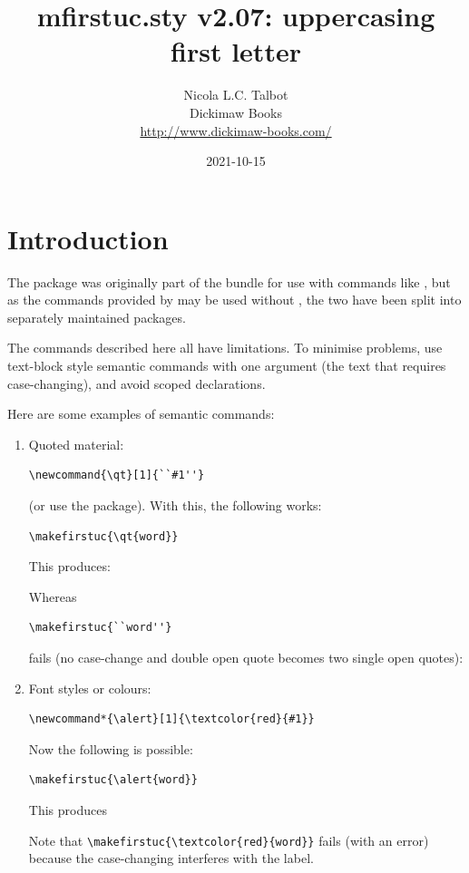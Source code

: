 \documentclass[report]{nlctdoc}
\begin{document}
\MakeShortVerb{|}
 \title{mfirstuc.sty v2.07: 
uppercasing first letter}
 \author{Nicola L.C. Talbot\\[10pt]
Dickimaw Books\\
\url{http://www.dickimaw-books.com/}}

 \date{2021-10-15}
 \maketitle
 \tableofcontents

 \chapter{Introduction}
 \label{sec:intro}

The  package was originally part of the
 bundle for use with commands like , but
as the commands provided by  may be used without
, the two have been split into separately
maintained packages.

\begin{important}
The commands described here all have limitations. To minimise
problems, use text-block style semantic commands with one argument
(the text that requires case-changing), and avoid scoped 
declarations.
\end{important}

Here are some examples of semantic commands:
\begin{enumerate}
\item Quoted material:
\begin{verbatim}
\newcommand{\qt}[1]{``#1''}
\end{verbatim}
(or use the  package). With this, the following
works:
\begin{verbatim}
\makefirstuc{\qt{word}}
\end{verbatim}
This produces:
\begin{display}
\end{display}
Whereas 
\begin{verbatim}
\makefirstuc{``word''}
\end{verbatim}
fails (no case-change and double open quote becomes two single open
quotes):
\begin{display}
\end{display}

\item Font styles or colours:
\begin{verbatim}
\newcommand*{\alert}[1]{\textcolor{red}{#1}}
\end{verbatim}
Now the following is possible:
\begin{verbatim}
\makefirstuc{\alert{word}}
\end{verbatim}
This produces
\begin{display}
\newcommand*{\alert}[1]{\textcolor{red}{#1}}%
\makefirstuc{\alert{word}}
\end{display}
Note that \verb|\makefirstuc{\textcolor{red}{word}}| fails
(with an error) because the case-changing interferes with the label.
\end{enumerate}
\end{document}
